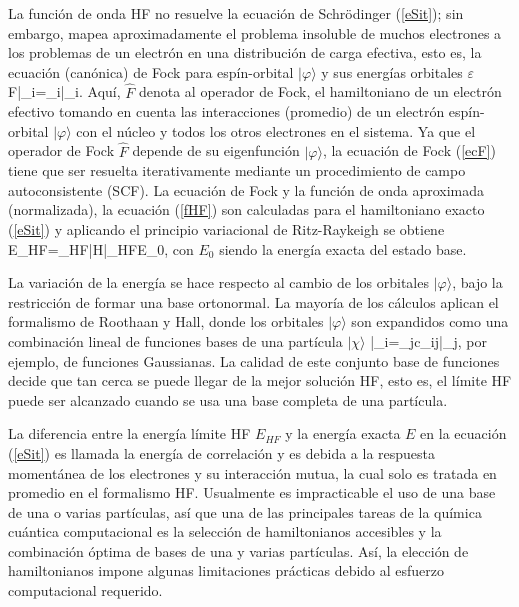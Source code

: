 La funci\'on de onda HF no resuelve la ecuaci\'on de Schr\"odinger
(\ref{eSit}); sin embargo, mapea aproximadamente el problema 
insoluble de muchos electrones a los problemas de un electr\'on en 
una distribuci\'on de carga efectiva, esto es, la ecuaci\'on 
(can\'onica) de Fock para esp\'in-orbital $|\varphi\rangle$ y sus 
energ\'ias orbitales $\varepsilon$
\be\label{ecF}
\hat F|\varphi_i\rangle=\varepsilon_i|\varphi_i\rangle.
\ee
Aqu\'i, $\hat F$ denota al operador de Fock, el hamiltoniano de un
electr\'on efectivo tomando en cuenta las interacciones (promedio) 
de un electr\'on esp\'in-orbital $|\varphi\rangle$ con el n\'ucleo y 
todos los otros electrones en el sistema. Ya que el operador de Fock
$\hat F$ depende de su eigenfunci\'on $|\varphi\rangle$, la
ecuaci\'on de Fock (\ref{ecF}) tiene que ser resuelta iterativamente
mediante un procedimiento de campo autoconsistente (SCF). La 
ecuaci\'on de Fock y la funci\'on de onda aproximada (normalizada), 
la ecuaci\'on (\ref{fHF}) son calculadas para el hamiltoniano exacto 
(\ref{eSit}) y aplicando el principio variacional de Ritz-Raykeigh se
obtiene
\be
E_{HF}=\langle\Phi_{HF}|\hat H|\Phi_{HF}\rangle\geq E_0,
\ee
con $E_0$ siendo la energ\'ia exacta del estado base. 

La variaci\'on de la energ\'ia se hace respecto al cambio de los
orbitales $|\varphi\rangle$, bajo la restricci\'on de formar una 
base ortonormal. La mayor\'ia de los c\'alculos aplican el formalismo
de Roothaan y Hall, donde los orbitales $|\varphi\rangle$ son 
expandidos como una combinaci\'on lineal de funciones bases de una
part\'icula $|\chi\rangle$
\be
|\varphi_i\rangle=\sum_jc_{ij}|\chi_j\rangle,
\ee
por ejemplo, de funciones Gaussianas. La calidad de este conjunto 
base de funciones decide que tan cerca se puede llegar de la mejor
soluci\'on HF, esto es, el l\'imite HF puede ser alcanzado cuando se
usa una base completa  de una part\'icula.

La diferencia entre la energ\'ia l\'imite HF $E_{HF}$ y la energ\'ia 
exacta $E$ en la ecuaci\'on (\ref{eSit}) es llamada la energ\'ia de 
correlaci\'on y es debida a la respuesta moment\'anea de los 
electrones y su interacci\'on mutua, la cual solo es tratada en 
promedio en el formalismo HF. Usualmente es impracticable el uso de 
una base de una o varias part\'iculas, as\'i que una de las 
principales tareas de la qu\'imica cu\'antica computacional es la 
selecci\'on de hamiltonianos accesibles y la combinaci\'on \'optima 
de bases de una y varias part\'iculas. As\'i, la elecci\'on de 
hamiltonianos impone algunas limitaciones pr\'acticas debido al 
esfuerzo computacional requerido. 

